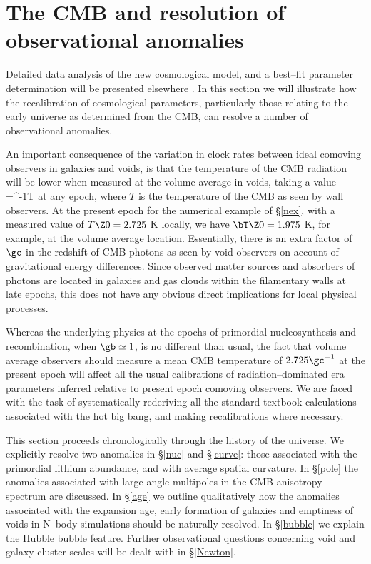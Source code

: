 \documentclass[12pt]{iopart}
\begin{document}
\section{The CMB and resolution of observational anomalies\label{cmb}}

Detailed data analysis of the new cosmological model, and a best--fit
parameter determination will be presented elsewhere \cite{paper2}.
In this section we will illustrate how the recalibration of cosmological
parameters, particularly those relating to the early universe as determined
from the CMB, can resolve a number of observational anomalies.

An important consequence of the variation in clock rates between ideal
comoving observers in galaxies and voids, is that the temperature of
the CMB radiation will be lower when measured at the volume average
in voids, taking a value
\beq \bT=\gb^{-1}T \label{vtemp}\eeq
at any epoch, where $T$ is the temperature
of the CMB as seen by wall observers. At the present epoch for the numerical
example of \S\ref{nex}, with a measured value of $T\Z0=2.725$ K locally, we
have $\bT\Z0=1.975$ K, for example, at the volume average location.
Essentially, there is an extra factor of $\gc$ in the redshift of CMB photons
as seen by void observers on account of gravitational energy differences.
Since observed matter sources and absorbers of photons are located in
galaxies and gas clouds within the filamentary walls at late epochs, this
does not have any obvious direct implications for local physical processes.

Whereas the underlying physics at the epochs of primordial nucleosynthesis
and recombination, when $\gb\simeq1$, is no different than usual, the fact
that volume average observers should measure a mean CMB temperature of
$2.725{\gc}^{-1}$ at the present epoch will affect all the usual
calibrations of radiation--dominated era parameters inferred relative to
present epoch comoving observers. We are faced with the task of systematically
rederiving all the standard textbook calculations \cite{Peebles,KT}
associated with the hot big bang, and making recalibrations where
necessary.

This section proceeds chronologically through the history of the universe.
We explicitly resolve two anomalies in \S\ref{nuc} and \S\ref{curve}:
those associated with the primordial lithium abundance, and with average
spatial curvature. In \S\ref{pole} the anomalies associated with large
angle multipoles in the CMB anisotropy spectrum are discussed.
In \S\ref{age} we outline qualitatively how the anomalies associated with
the expansion age, early formation of galaxies and emptiness of voids in
N--body simulations should be naturally resolved. In \S\ref{bubble} we
explain the Hubble bubble feature. Further observational
questions concerning void and galaxy cluster scales will be dealt with in
\S\ref{Newton}.
\end{document}
